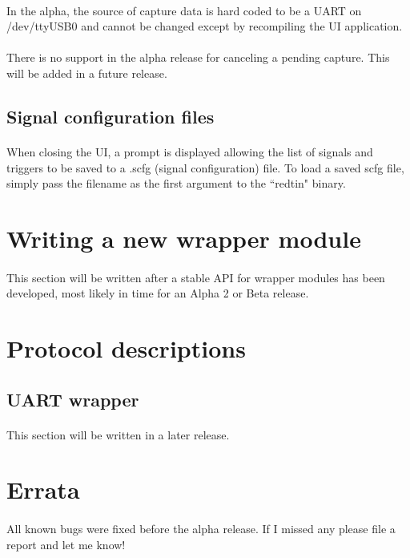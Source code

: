 \documentclass[pdftex]{article}
\begin{document}
\paragraph*{}
In the alpha, the source of capture data is hard coded to be a UART on /dev/ttyUSB0 and cannot be changed except by
recompiling the UI application.

\paragraph*{}
There is no support in the alpha release for canceling a pending capture. This will be added in a future release.

\subsection{Signal configuration files}
\paragraph*{}
When closing the UI, a prompt is displayed allowing the list of signals and triggers to be saved to a .scfg (signal
configuration) file. To load a saved scfg file, simply pass the filename as the first argument to the ``redtin" binary.

\pagebreak
\section{Writing a new wrapper module}

\paragraph*{}
This section will be written after a stable API for wrapper modules has been developed, most likely in time for an
Alpha 2 or Beta release.

\pagebreak
\section{Protocol descriptions}

\subsection{UART wrapper}

\paragraph*{}
This section will be written in a later release.

\pagebreak
\section{Errata}

\paragraph*{}
All known bugs were fixed before the alpha release. If I missed any please file a report and let me know!
\end{document}
